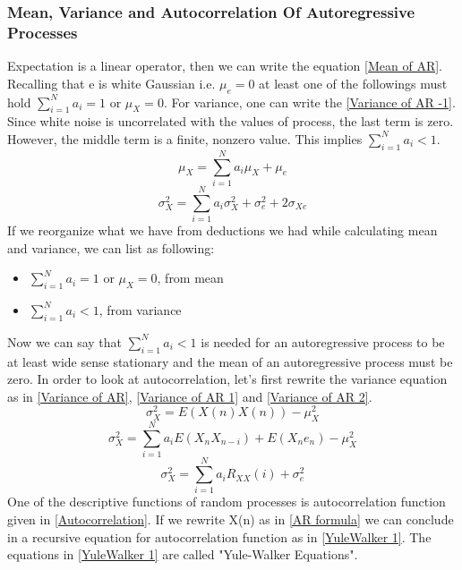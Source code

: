 \documentclass[a4paper,onesided,12pt]{report}
\begin{document}
\subsubsection{Mean, Variance and Autocorrelation Of Autoregressive Processes}
Expectation is a linear operator, then we can write the equation \ref{Mean of AR}. Recalling that e is white Gaussian i.e. $\mu_e=0$ at least one of the followings must hold $\sum_{i=1}^{N}a_i = 1$ or $\mu_X = 0$. For variance, one can write the \ref{Variance of AR -1}. Since white noise is uncorrelated with the values of process, the last term is zero. However, the middle term is a finite, nonzero value. This implies $\sum_{i=1}^{N}a_i < 1$. 
\begin{equation}\label{Mean of AR}
\mu_X = \sum_{i=1}^{N}{a_i\mu_X} + \mu_e 
\end{equation}
\begin{equation}\label{Variance of AR -1}
\sigma_{X}^2 = \sum_{i=1}^{N}{a_i\sigma_X^2} + \sigma_e^2 + 2\sigma_{Xe} 
\end{equation}
If we reorganize what we have from deductions we had while calculating mean and variance, we can list as following:
\begin{itemize}
	\item $\sum_{i=1}^{N}a_i = 1$ or $\mu_X = 0$, from mean
	\item $\sum_{i=1}^{N}a_i < 1$, from variance
\end{itemize}
Now we can say that $\sum_{i=1}^{N}a_i < 1$ is needed for an autoregressive process to be at least wide sense stationary and the mean of an autoregressive process must be zero.\linebreak
In order to look at autocorrelation, let's first rewrite the variance equation as in \ref{Variance of AR}, \ref{Variance of AR 1} and \ref{Variance of AR 2}.
\begin{equation}\label{Variance of AR}
\sigma_{X}^2 = E(X(n)X(n)) - \mu_{X}^2 
\end{equation}
\begin{equation}\label{Variance of AR 1}
\sigma_{X}^2 = \sum_{i=1}^{N}a_iE(X_nX_{n-i}) + E(X_ne_n) - \mu_{X}^2 
\end{equation}
\begin{equation}\label{Variance of AR 2}
\sigma_{X}^2 = \sum_{i=1}^{N}a_iR_{XX}(i) + \sigma_e^2
\end{equation}
One of the descriptive functions of random processes is autocorrelation function given in \ref{Autocorrelation}. If we rewrite X(n) as in \ref{AR formula} we can conclude in a recursive equation for autocorrelation function as in \ref{YuleWalker 1}. The equations in \ref{YuleWalker 1} are called "Yule-Walker Equations".
\end{document}
